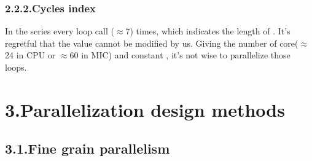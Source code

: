 \documentclass{article}
\begin{document}
\subsubsection{2.2.2.\hspace*{0.5em}Cycles index}\label{sec-cycles-index}%

\noindent{}In the  series every loop call  (\ensuremath{\approx}7) times, which indicates the length of . It's regretful that the value cannot be modified by us. Giving the number of core(\ensuremath{\approx}24 in CPU or \ensuremath{\approx}60 in MIC) and constant , it's not wise to parallelize those loops.%

\section{3.\hspace*{0.5em}Parallelization design methods}\label{sec-parallelization-design-methods}%

\subsection{3.1.\hspace*{0.5em}Fine grain parallelism}\label{sec-fine-grain-parallelism}%
\end{document}
